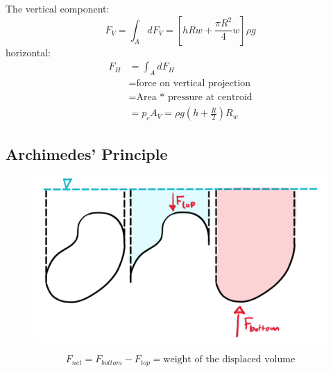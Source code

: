 The vertical component:
\begin{equation*}
	F_V = \int_AdF_V = \left[hRw+\frac{\pi R^2}{4}w\right] \rho g
\end{equation*}
horizontal:
\begin{equation*}
	\begin{split}
		F_H &= \int_A dF_H \\
		&=\text{force on vertical projection} \\
		&= \text{Area * pressure at centroid} \\
		&=  p_cA_V = \rho g\left(h+\frac R2 \right)R_w
	\end{split}
\end{equation*}


\subsection{Archimedes' Principle}
\begin{figure}[H]
	\centering
	\includegraphics[width=0.7\linewidth]{Sketches/Archimedes}
	\label{fig:archimedes}
\end{figure}
$$
F_{net} = F_{bottom} - F_{top} = \text{weight of the displaced volume}
$$



